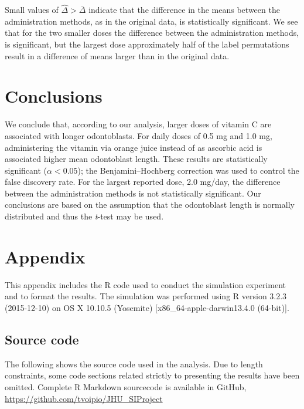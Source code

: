 \documentclass[a4paper]{article}
\begin{document}
Small values of \(\hat{\Delta} > \bar{\Delta}\) indicate that the
difference in the means between the administration methods, as in the
original data, is statistically significant. We see that for the two
smaller doses the difference between the administration methods, is
significant, but the largest dose approximately half of the label
permutations result in a difference of means larger than in the original
data.

\section{Conclusions}\label{conclusions}

We conclude that, according to our analysis, larger doses of vitamin C
are associated with longer odontoblasts. For daily doses of 0.5 mg and
1.0 mg, administering the vitamin via orange juice instead of as
ascorbic acid is associated higher mean odontoblast length. These
results are statistically significant (\(\alpha < 0.05\)); the
Benjamini--Hochberg correction was used to control the false discovery
rate. For the largest reported dose, 2.0 mg/day, the difference between
the administration methods is not statistically significant. Our
conclusions are based on the assumption that the odontoblast length is
normally distributed and thus the \emph{t}-test may be used.

\section{Appendix}\label{appendix}

This appendix includes the R code used to conduct the simulation
experiment and to format the results. The simulation was performed using
R version 3.2.3 (2015-12-10) on OS X 10.10.5 (Yosemite)
{[}x86\_64-apple-darwin13.4.0 (64-bit){]}.

\subsection{Source code}\label{source-code}

The following shows the source code used in the analysis. Due to length
constraints, some code sections related strictly to presenting the
results have been omitted. Complete R Markdown sourcecode is available
in GitHub, \url{https://github.com/tvoipio/JHU_SIProject}
\end{document}
